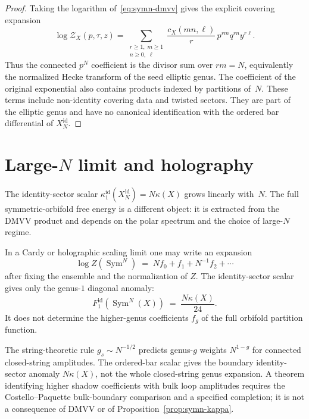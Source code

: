 \begin{proof}
Taking the logarithm of~\eqref{eq:symn-dmvv} gives the explicit
covering expansion
\[
 \log\mathcal Z_X(p,\tau,z)
 =
 \sum_{\substack{r\geq1,\; m\geq1\\ n\geq0,\;\ell}}
 \frac{c_X(mn,\ell)}{r}\,
 p^{rm}q^{rn}y^{r\ell}.
\]
Thus the connected $p^N$ coefficient is the divisor sum over
$rm=N$, equivalently the normalized Hecke transform of the seed
elliptic genus. The coefficient of the original exponential also
contains products indexed by partitions of~$N$. These terms include
non-identity covering data and twisted sectors. They are part of the
elliptic genus and have no canonical identification with the ordered
bar differential of $X_N^{\mathrm{id}}$.
\end{proof}



\section{Large-$N$ limit and holography}\label{sec:symn-large-N}

The identity-sector scalar
$\kappa^{\mathrm{id}}_1(X_N^{\mathrm{id}})=N\kappa(X)$ grows
linearly with~$N$. The full symmetric-orbifold free energy is a
different object: it is extracted from the DMVV product and depends
on the polar spectrum and the choice of large-$N$ regime.

In a Cardy or holographic scaling limit one may write an expansion
\begin{equation}\label{eq:symn-large-N-expansion}
 \log Z(\operatorname{Sym}^N)
 \;=\; N f_0 + f_1 + N^{-1} f_2 + \cdots
\end{equation}
after fixing the ensemble and the normalization of $Z$. The
identity-sector scalar gives only the genus-$1$ diagonal anomaly:
\begin{equation}\label{eq:symn-genus-scaling}
 F^{\mathrm{id}}_1(\operatorname{Sym}^N(X))
 \;=\; \frac{N\kappa(X)}{24}.
\end{equation}
It does not determine the higher-genus coefficients $f_g$ of the
full orbifold partition function.

\begin{remark}
\label{rem:symn-genus-vs-1-over-N}
The string-theoretic rule $g_s\sim N^{-1/2}$ predicts genus-$g$
weights $N^{1-g}$ for connected closed-string amplitudes. The
ordered-bar scalar gives the boundary identity-sector anomaly
$N\kappa(X)$, not the whole closed-string genus expansion. A theorem
identifying higher shadow coefficients with bulk loop amplitudes
requires the Costello--Paquette bulk-boundary comparison and a
specified completion; it is not a consequence of DMVV or of
Proposition~\ref{prop:symn-kappa}.
\end{remark}

